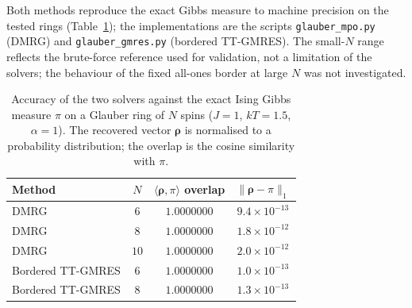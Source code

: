 \documentclass[12pt]{article}
\newcommand{\brho}{\boldsymbol{\rho}}
\theoremstyle{definition}
\theoremstyle{remark}
\begin{document}
Both methods reproduce the exact Gibbs measure to machine precision on the tested rings (Table~\ref{tab:numerics}); the implementations are the scripts \texttt{glauber\_mpo.py} (DMRG) and \texttt{glauber\_gmres.py} (bordered TT-GMRES). The small-$N$ range reflects the brute-force reference used for validation, not a limitation of the solvers; the behaviour of the fixed all-ones border at large $N$ was not investigated.

\begin{table}[H]
\centering
\begin{tabular}{l c c c}
\hline
Method & $N$ & $\langle \brho, \pi\rangle$ overlap & $\|\brho - \pi\|_1$ \\
\hline
DMRG            & $6$  & $1.0000000$ & $9.4 \times 10^{-13}$ \\
DMRG            & $8$  & $1.0000000$ & $1.8 \times 10^{-12}$ \\
DMRG            & $10$ & $1.0000000$ & $2.0 \times 10^{-12}$ \\
Bordered TT-GMRES & $6$  & $1.0000000$ & $1.0 \times 10^{-13}$ \\
Bordered TT-GMRES & $8$  & $1.0000000$ & $1.3 \times 10^{-13}$ \\
\hline
\end{tabular}
\caption{Accuracy of the two solvers against the exact Ising Gibbs measure $\pi$ on a Glauber ring of $N$ spins ($J=1$, $kT=1.5$, $\alpha=1$). The recovered vector $\brho$ is normalised to a probability distribution; the overlap is the cosine similarity with $\pi$.}
\label{tab:numerics}
\end{table}
\end{document}
